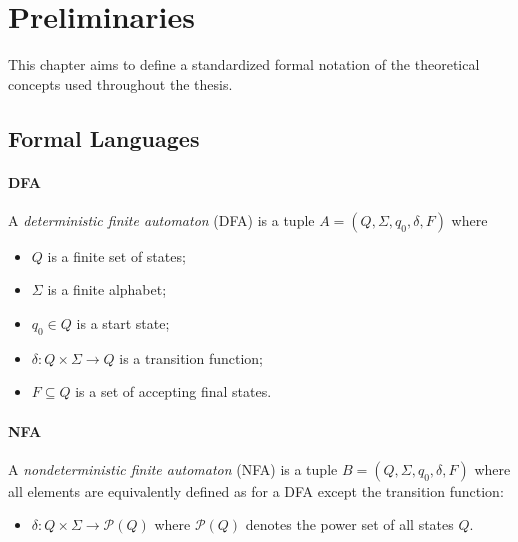 \chapter{Preliminaries}\label{chapter:preliminaries}
This chapter aims to define a standardized formal notation of the theoretical concepts used throughout the thesis.


\section{Formal Languages}

\subsubsection{DFA}
A \emph{deterministic finite automaton} (DFA) is a tuple $A = (Q, \Sigma, q_{0},\delta,F)$ where
\begin{itemize}[-,noitemsep]
\item $Q$ is a finite set of states;
\item $\Sigma$ is a finite alphabet;
\item $q_{0} \in Q$ is a start state;
\item $\delta : Q \times \Sigma \rightarrow Q$ is a transition function;
\item $F \subseteq Q$ is a set of accepting final states.
\end{itemize}

\subsubsection{NFA}
A \emph{nondeterministic finite automaton} (NFA) is a tuple $B = (Q, \Sigma, q_{0},\delta,F)$ where all elements are equivalently defined as for a DFA except the transition function:
\begin{itemize}[-,noitemsep]
\item $\delta : Q \times \Sigma \rightarrow \mathcal{P}(Q)$ where $\mathcal{P}(Q)$ denotes the power set of all states $Q$.
\end{itemize}

